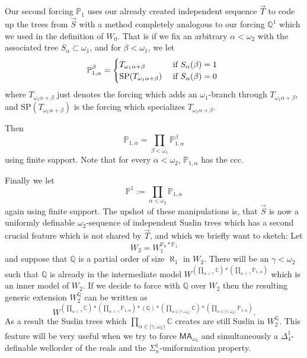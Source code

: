 \documentclass[a4paper,11pt]{article}
\newcommand{\forceP}{\mathbb{P}}
\newcommand{\forceQ}{\mathbb{Q}}
\newcommand{\MA}{\mathsf{MA_{\omega_1}}}
\begin{document}
 Our second forcing $\forceP_1$ uses our already created independent sequence $\vec{T}$ to code up the trees from $\vec{S}$ with a method completely {analogous to our forcing $\forceQ^1$ which} we used in the definition of $W_0$. That is if we fix an arbitrary $\alpha < \omega_2$ with the associated tree $S_{\alpha} \subset \omega_1$, 
and for $\beta < \omega_1$, we let
 \[ \forceP^{\beta}_{1,\alpha}= \begin{cases} T_{ \omega_1 \alpha + \beta} & \text{ if $S_{\alpha} (\beta)=1$ }
 \\
 \hbox{SP} (T_{\omega_1 \alpha+\beta}) & \text{ if $S_{\alpha} (\beta) =0$ }
 \end{cases} \]
where $T_{ \omega_1 \alpha + \beta}$ just denotes the forcing which adds an $\omega_1$-branch through $T_{ \omega_1 \alpha + \beta}$, and SP$(T_{ \omega_1 \alpha + \beta})$ is the forcing which specializes $T_{ \omega_1 \alpha + \beta}$.

Then
\[ \forceP_{1,\alpha} = \prod_{\beta < \omega_1} \forceP^{\beta}_{1,\alpha} \] using finite support. Note that for every $\alpha < \omega_2$, $\forceP_{1,\alpha}$ has the ccc.

Finally we let
\[ \forceP^1 := \prod_{\alpha < \omega_2} \forceP_{1,\alpha} \]
again using finite support. The upshot of these manipulations is, that $\vec{S}$ is now a uniformly definable $\omega_2$-sequence of independent Suslin trees which has a second crucial feature which is not shared by $\vec{T}$, and {which we briefly want to sketch: Let }\[ W_2= W_1^{\forceP_0 \ast \forceP_1}\]{ and suppose that 
$\forceQ$ is a partial order of size $\aleph_1$ in $W_2$. There will be an $\gamma < \omega_2$ such that $\forceQ$ is already in the intermediate model $W^{(\prod_{\alpha < \gamma} \mathbb{C} ) \ast (\prod_{\alpha < \gamma}  \forceP_{1,\alpha} )}$ which is an inner model of $W_2$}.
{If we decide to force with $\forceQ$ over $W_2$ then the resulting generic extension $W_2^{\forceQ}$ can be written as}
\[W^{(\prod_{\alpha < \gamma} \mathbb{C} ) \ast (\prod_{\alpha < \gamma}  \forceP_{1,\alpha}) \ast ( \forceQ ) \ast (\prod_{\alpha \in [\gamma, \omega_2) } \mathbb{C} ) \ast ( \prod_{\alpha \in [\gamma, \omega_2)}  \forceP_{1,\alpha} )}.\] {As a result the Suslin trees which $\prod_{\alpha \in [\gamma,\omega_2)} \mathbb{C}$ creates are still Suslin in
$W_2^{\forceQ}$. This feature will be very useful when we try to force $\MA$ and simultaneously a $\Delta^1_4$-definable wellorder of the reals and the $\Sigma^1_n$-uniformization property.}
\end{document}
